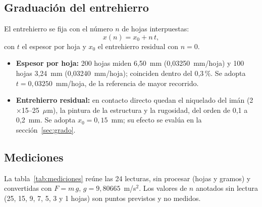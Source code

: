 \documentclass[11pt,a4paper]{article}
\begin{document}
\subsection{Graduación del entrehierro}
El entrehierro se fija con el número $n$ de hojas interpuestas:
\begin{equation}
x(n)=x_0+n\,t ,
\end{equation}
con $t$ el espesor por hoja y $x_0$ el entrehierro residual con $n=0$.

\begin{itemize}
  \item \textbf{Espesor por hoja:} 200 hojas miden 6,50~mm (0,03250~mm/hoja) y 100 hojas 3,24~mm
        (0,03240~mm/hoja); coinciden dentro del 0,3\,\%. Se adopta $t=0{,}03250$~mm/hoja, de la
        referencia de mayor recorrido.
  \item \textbf{Entrehierro residual:} en contacto directo quedan el niquelado del imán
        (2$\times$15--25~$\mu$m), la pintura de la estructura y la rugosidad, del orden de 0,1 a 0,2~mm. Se
        adopta $x_0=0{,}15$~mm; su efecto se evalúa en la sección~\ref{sec:grado}.
\end{itemize}

\subsection{Mediciones}
La tabla~\ref{tab:mediciones} reúne las 24 lecturas, sin procesar (hojas y gramos) y convertidas con
$F=m\,g$, $g=9{,}80665$~m/s$^2$. Los valores de $n$ anotados sin lectura (25, 15, 9, 7, 5, 3 y 1 hojas)
son puntos previstos y no medidos.
\end{document}
